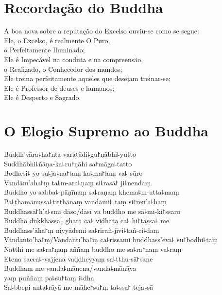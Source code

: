 \chapter{Recordação do Buddha}

\begin{leader}
\end{leader}

A boa nova sobre a reputação do Excelso ouviu-se como se segue:\\
Ele, o Excelso, é realmente O Puro,\\
\vin o Perfeitamente Iluminado;\\
Ele é Impecável na conduta e na compreensão,\\
\vin o Realizado, o Conhecedor dos mundos;\\
Ele treina perfeitamente aqueles que desejam treinar-se;\\
Ele é Professor de deuses e humanos;\\
Ele é Desperto e Sagrado.

\clearpage

\chapter*{O Elogio Supremo ao Buddha}

\delegateSetUseNext

\begin{leader}
\end{leader}

Buddh'vāra꜕ha꜓nta-varatādi꜕gu꜓ṇābhi꜕yutto\\
Suddhābhi꜕ñāṇa-ka꜕ru꜓ṇāhi sa꜓māga꜕tatto\\
Bodhesi꜕ yo su꜕ja꜕na꜓taṃ ka꜕ma꜓laṃ va꜕ sūro\\
Vandām'aha꜓ṃ ta꜕m-ara꜕ṇaṃ si꜕rasā꜓ ji꜕nendaṃ\\
Buddho yo sabba꜕-pāṇīnaṃ sa꜕raṇaṃ khema꜕m-utta꜕maṃ\\
Pa꜕ṭhamānussa꜕tiṭṭhānaṃ vandāmi꜕ taṃ si꜓ren'a꜕haṃ\\
Buddhassā꜓h'a꜕smi dāso/dāsī va buddho me sā꜕mi-ki꜓ssaro\\
Buddho dukkhassa꜕ ghātā ca꜕ vidhātā ca꜕ hi꜓tassa꜕ me\\
Buddhass'āha꜓ṃ niyyādemi sa꜕rīrañ-jīvi꜕tañ-ci꜕daṃ\\
Vandanto'ha꜓ṃ/Vandantī'ha꜓ṃ ca꜕rissāmi buddhass'eva꜕ su꜓bodhi꜕taṃ\\
Natthi me sa꜕ra꜓ṇaṃ aññaṃ buddho me sa꜕ra꜓ṇaṃ va꜕raṃ\\
Etena sacca꜕-vajjena vaḍḍheyyaṃ sa꜕tthu-sā꜓sane\\
Buddhaṃ me vanda꜕mānena/vanda꜕mānāya\\
\vin yaṃ puññaṃ pa꜕su꜓taṃ i꜕dha\\
Sa꜕bbepi anta꜕rāyā me māhe꜓su꜓ṃ ta꜕ssa꜓ teja꜕sā


